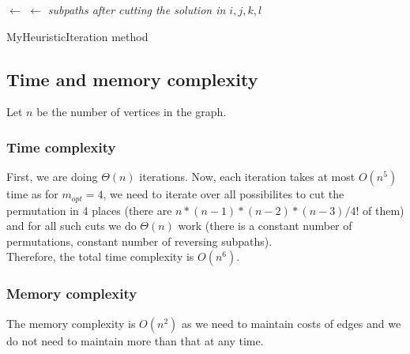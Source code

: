 \documentclass[12pt]{article}
\begin{document}
\begin{algorithm}[H]
 \BestTour $\leftarrow$ \Perm\;
  {
	\Intervals $\leftarrow$ \emph{subpaths after cutting the solution in $i,j,k,l$}\;
	\KwRet{\NewTour}
 }
 \caption{MyHeuristicIteration method}
\end{algorithm}
 
\subsection*{Time and memory complexity}
Let $n$ be the number of vertices in the graph.
\subsubsection*{Time complexity}
First, we are doing $\Theta(n)$ iterations.
Now, each iteration takes at most $O(n^5)$ time as for $m_{opt}=4$, we need to iterate over all possibilites to cut the permutation in 4 places (there are $n*(n-1)*(n-2)*(n-3)/4!$ of them) and for all such cuts we do $\Theta(n)$ work (there is a constant number of permutations, constant number of reversing subpaths).\\
Therefore, the total time complexity is $O(n^6)$.

\subsubsection*{Memory complexity}
The memory complexity is $O(n^2)$ as we need to maintain costs of edges and we do not need to maintain more than that at any time.
\end{document}
